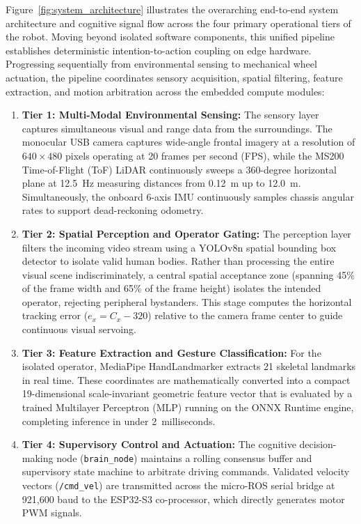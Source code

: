 Figure~\ref{fig:system_architecture} illustrates the overarching end-to-end system architecture and cognitive signal flow across the four primary operational tiers of the robot. Moving beyond isolated software components, this unified pipeline establishes deterministic intention-to-action coupling on edge hardware. Progressing sequentially from environmental sensing to mechanical wheel actuation, the pipeline coordinates sensory acquisition, spatial filtering, feature extraction, and motion arbitration across the embedded compute modules:
\begin{enumerate}
    \item \textbf{Tier 1: Multi-Modal Environmental Sensing:} The sensory layer captures simultaneous visual and range data from the surroundings. The monocular USB camera captures wide-angle frontal imagery at a resolution of $640 \times 480$ pixels operating at 20 frames per second (FPS), while the MS200 Time-of-Flight (ToF) LiDAR continuously sweeps a 360-degree horizontal plane at 12.5~Hz measuring distances from 0.12~m up to 12.0~m. Simultaneously, the onboard 6-axis IMU continuously samples chassis angular rates to support dead-reckoning odometry.
    \item \textbf{Tier 2: Spatial Perception and Operator Gating:} The perception layer filters the incoming video stream using a YOLOv8n spatial bounding box detector to isolate valid human bodies. Rather than processing the entire visual scene indiscriminately, a central spatial acceptance zone (spanning 45\% of the frame width and 65\% of the frame height) isolates the intended operator, rejecting peripheral bystanders. This stage computes the horizontal tracking error ($e_x = C_x - 320$) relative to the camera frame center to guide continuous visual servoing.
    \item \textbf{Tier 3: Feature Extraction and Gesture Classification:} For the isolated operator, MediaPipe HandLandmarker extracts 21 skeletal landmarks in real time. These coordinates are mathematically converted into a compact 19-dimensional scale-invariant geometric feature vector that is evaluated by a trained Multilayer Perceptron (MLP) running on the ONNX Runtime engine, completing inference in under 2~milliseconds.
    \item \textbf{Tier 4: Supervisory Control and Actuation:} The cognitive decision-making node (\texttt{brain\_node}) maintains a rolling consensus buffer and supervisory state machine to arbitrate driving commands. Validated velocity vectors (\texttt{/cmd\_vel}) are transmitted across the micro-ROS serial bridge at 921,600 baud to the ESP32-S3 co-processor, which directly generates motor PWM signals.
\end{enumerate}

